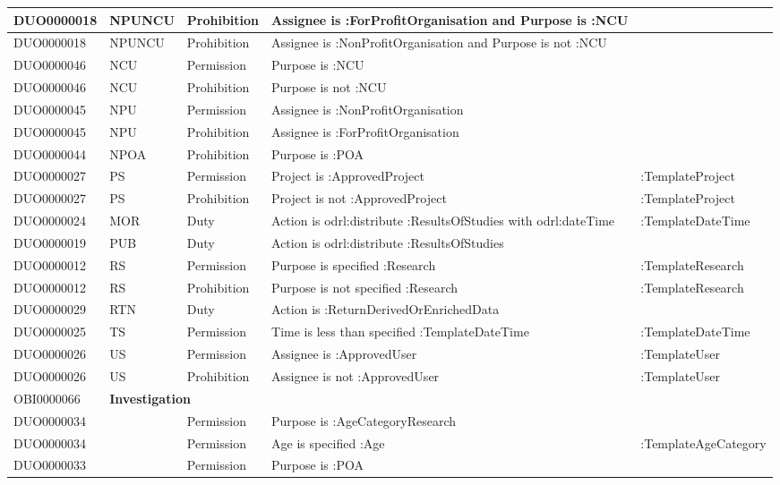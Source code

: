\begin{table}[htp]
{\begin{tabular}{p{1.7cm}||p{1.2cm}|p{1.45cm}|p{8.6cm}|p{3.1cm}}
DUO0000018 & NPUNCU & Prohibition & Assignee is :ForProfitOrganisation and Purpose is :NCU & ~ \\ \hline
DUO0000018 & NPUNCU & Prohibition & Assignee is :NonProfitOrganisation and Purpose is not :NCU & ~ \\ \hline
DUO0000046 & NCU & Permission & Purpose is :NCU & ~ \\ \hline
DUO0000046 & NCU & Prohibition & Purpose is not :NCU & ~ \\ \hline
DUO0000045 & NPU & Permission & Assignee is :NonProfitOrganisation & ~ \\ \hline
DUO0000045 & NPU & Prohibition & Assignee is :ForProfitOrganisation & ~ \\ \hline
DUO0000044 & NPOA & Prohibition & Purpose is :POA & ~ \\ \hline
DUO0000027 & PS & Permission & Project is :ApprovedProject & :TemplateProject \\ \hline
DUO0000027 & PS & Prohibition & Project is not :ApprovedProject & :TemplateProject \\ \hline
DUO0000024 & MOR & Duty & Action is odrl:distribute :ResultsOfStudies with odrl:dateTime & :TemplateDateTime \\ \hline
DUO0000019 & PUB & Duty & Action is odrl:distribute :ResultsOfStudies & ~ \\ \hline
DUO0000012 & RS & Permission & Purpose is specified :Research & :TemplateResearch \\ \hline
DUO0000012 & RS & Prohibition & Purpose is not specified :Research & :TemplateResearch \\ \hline
DUO0000029 & RTN & Duty & Action is :ReturnDerivedOrEnrichedData & ~ \\ \hline
DUO0000025 & TS & Permission & Time is less than specified :TemplateDateTime & :TemplateDateTime \\ \hline
DUO0000026 & US & Permission & Assignee is :ApprovedUser & :TemplateUser \\ \hline
DUO0000026 & US & Prohibition & Assignee is not :ApprovedUser & :TemplateUser \\ \hline\hline
OBI0000066 & \multicolumn{4}{l}{\textbf{Investigation}} \\ \hline\hline
DUO0000034 & & Permission & Purpose is :AgeCategoryResearch & \\ \hline
DUO0000034 & & Permission & Age is specified :Age & :TemplateAgeCategory \\ \hline
DUO0000033 & ~ & Permission & Purpose is :POA & \\ \hline

\end{tabular}}
\end{table}
